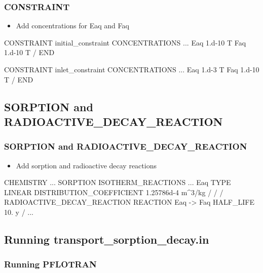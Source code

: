 \documentclass{beamer}
\newcommand\magentacomment[1]{{{\color{magenta} #1}}}
\begin{document}
\begin{frame}[fragile]\frametitle{CONSTRAINT}

\begin{itemize}
  \item Add concentrations for Eaq and Faq
\end{itemize}

\begin{semiverbatim}
CONSTRAINT initial_constraint
  CONCENTRATIONS
    ...
    \magentacomment{Eaq   1.d-10   T}
    \magentacomment{Faq   1.d-10   T}
  /
END

CONSTRAINT inlet_constraint
  CONCENTRATIONS
    ...
    \magentacomment{Eaq   1.d-3    T}
    \magentacomment{Faq   1.d-10   T}
  /
END
\end{semiverbatim}

\end{frame}

\subsection{SORPTION and RADIOACTIVE\_DECAY\_REACTION}

\begin{frame}[fragile]\frametitle{SORPTION and RADIOACTIVE\_DECAY\_REACTION}

\begin{itemize}
  \item Add sorption and radioactive decay reactions
\end{itemize}

\begin{semiverbatim}
CHEMISTRY
  ...
  SORPTION
    ISOTHERM_REACTIONS
      ...
      \magentacomment{Eaq}
        \magentacomment{TYPE LINEAR}
        \magentacomment{DISTRIBUTION_COEFFICIENT 1.25786d-4 m^3/kg}
      \magentacomment{/}
    /
  /
  \magentacomment{RADIOACTIVE_DECAY_REACTION}
    \magentacomment{REACTION Eaq -> Faq}
    \magentacomment{HALF_LIFE 10. y}
  \magentacomment{/}
  ...
\end{semiverbatim}

\end{frame}

\subsection{Running transport\_sorption\_decay.in}

\begin{frame}[fragile]\frametitle{Running PFLOTRAN}


\end{frame}
\end{document}
